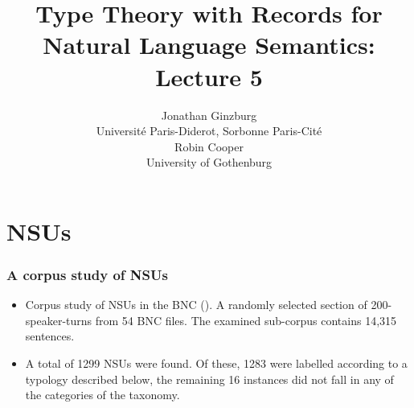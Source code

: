 \documentclass{beamer}
\title{Type Theory with Records for Natural Language Semantics:\\
  Lecture 5     }
\author{Jonathan Ginzburg\\
Universit\'e Paris-Diderot, Sorbonne Paris-Cit\'e\\
Robin Cooper\\ 
University of Gothenburg}
\date{}
\newcommand{\ignore}[1]{}
\begin{document}
\maketitle


\ignore{
Lecture 4.
We provide a unified theory of metacommunicative and illocutionary interaction on the basis of the notion of Austinian locutionary propositions. This provides a basis for describing various linguistic phenomena occuring during grounding and clarification interaction.
}



\section{NSUs}



\begin{frame}\frametitle{A corpus study of NSUs}

\begin{itemize}

\item Corpus study of NSUs in the BNC
  (\cite{fernandez-ginzburg-tal,raquel-diss}). A randomly selected
  section of 200-speaker-turns from 54 BNC files.  The examined
  sub-corpus contains 14,315 sentences.


\item A total of 1299 NSUs were found.  Of these, 1283 were labelled
  according to a typology described below, the remaining 16 instances
  did not fall in any of the categories of the taxonomy.

\ignore{
\item 
The labelling of the entire corpus of NSUs was done by one expert
annotator.

\item Two additional, non-expert annotators
annotated a total of 50 randomly selected instances  with the classes in the taxonomy.  


\item  $\kappa$:  0.76.  The non-expert annotators
  also achieved 92 \% and 96\% in antecedent sentence identification
  for each NSU, relative to expert annotation as a gold standard.}
  \end{itemize}\end{frame}
\end{document}
